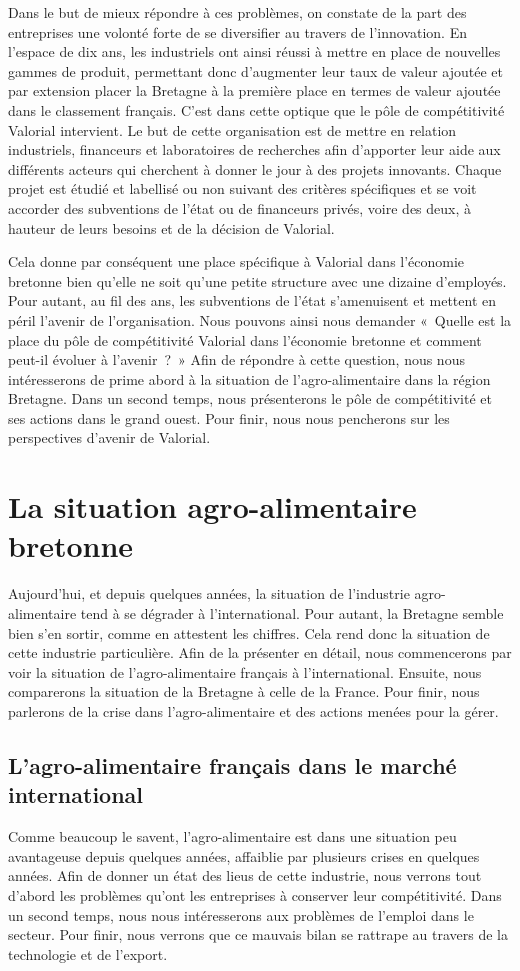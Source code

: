 \documentclass[a4paper,10pt]{report}
\begin{document}
	 Dans le but de mieux répondre à ces problèmes, on constate de la part des entreprises une volonté forte de se diversifier au travers de l’innovation. En l’espace de dix ans, les industriels ont ainsi réussi à mettre en place de nouvelles gammes de produit, permettant donc d’augmenter leur taux de valeur ajoutée et par extension placer la Bretagne à la première place en termes de valeur ajoutée dans le classement français. C’est dans cette optique que le pôle de compétitivité Valorial intervient. Le but de cette organisation est de mettre en relation industriels, financeurs et laboratoires de recherches afin d’apporter leur aide aux différents acteurs qui cherchent à donner le jour à des projets innovants. Chaque projet est étudié et labellisé ou non suivant des critères spécifiques et se voit accorder des subventions de l’état ou de financeurs privés, voire des deux, à hauteur de leurs besoins et de la décision de Valorial.
	 
	 Cela donne par conséquent une place spécifique à Valorial dans l’économie bretonne bien qu’elle ne soit qu’une petite structure avec une dizaine d’employés. Pour autant, au fil des ans, les subventions de l’état s’amenuisent et mettent en péril l’avenir de l’organisation. Nous pouvons ainsi nous demander « Quelle est la place du pôle de compétitivité Valorial dans l’économie bretonne et comment peut-il évoluer à l’avenir ? » Afin de répondre à cette question, nous nous intéresserons de prime abord à la situation de l’agro-alimentaire dans la région Bretagne. Dans un second temps, nous présenterons le pôle de compétitivité et ses actions dans le grand ouest. Pour finir, nous nous pencherons sur les perspectives d’avenir de Valorial.
	 
\chapter{La situation agro-alimentaire bretonne}
	Aujourd’hui, et depuis quelques années, la situation de l’industrie agro-alimentaire tend à se dégrader à l’international. Pour autant, la Bretagne semble bien s’en sortir, comme en attestent les chiffres. Cela rend donc la situation de cette industrie particulière. Afin de la présenter en détail, nous commencerons par voir la situation de l’agro-alimentaire français à l’international. Ensuite, nous comparerons la situation de la Bretagne à celle de la France. Pour finir, nous parlerons de la crise dans l’agro-alimentaire et des actions menées pour la gérer.

	\section{L’agro-alimentaire français dans le marché international}
		Comme beaucoup le savent, l’agro-alimentaire est dans une situation peu avantageuse depuis quelques années, affaiblie par plusieurs crises en quelques années. Afin de donner un état des lieus de cette industrie, nous verrons tout d’abord les problèmes qu’ont les entreprises à conserver leur compétitivité. Dans un second temps, nous nous intéresserons aux problèmes de l’emploi dans le secteur. Pour finir, nous verrons que ce mauvais bilan se rattrape au travers de la technologie et de l’export.
\end{document}
